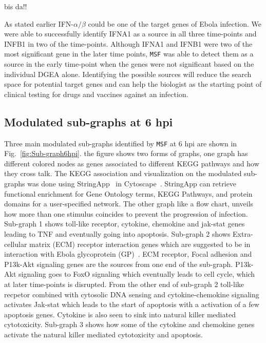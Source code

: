 \documentclass[10pt,a4paper,twocolumn]{article}
\newcommand{\TODO}[1]{\begingroup\color{red}#1\endgroup}
\begin{document}
\TODO{bis da!!}

As stated earlier IFN-$\alpha / \beta$ could be one of the target
genes of Ebola infection. We were able to successfully identify IFNA1
as a source in all three time-points and INFB1 in two of the
time-points. Although IFNA1 and IFNB1 were two of the most significant
gene in the later time points, \texttt{MSF} was able to detect them as
a source in the early time-point when the genes were not significant
based on the individual DGEA alone. Identifying the possible sources will
reduce the search space for potential target genes and can help the
biologist as the starting point of clinical testing for drugs and
vaccines against an infection.



\subsection*{Modulated sub-graphs at 6 hpi}

 Three main modulated sub-graphs identified by \texttt{MSF} at 6 hpi
 are shown in Fig.~\ref{fig:Sub-graph6hpi}. the figure shows two forms of graphs, one graph has different colored nodes as
 genes associated to different KEGG pathways and how they cross talk. The KEGG
 association and visualization on the modulated sub-graphs was done
 using StringApp~\cite{StringApp} in Cytoscape~\cite{Cyto}. StringApp can retrieve functional enrichment for Gene Ontology terms, KEGG Pathways, and protein domains for a user-specified network. The other graph like a flow chart,
 unveils how more than one stimulus coincides to prevent the
 progression of infection. Sub-graph 1 shows toll-like receptor,
 cytokine, chemokine and jak-stat genes leading to TNF and eventually
 going into apoptosis. Sub-graph 2 shows Extra-cellular matrix (ECM)
 receptor interaction genes which are suggested to be in interaction
 with Ebola glycoprotein (GP)~\cite{Veljkovic}. ECM receptor, Focal
 adhesion and P13k-Akt signaling genes are the sources from one end of
 the sub-graph. P13k-Akt signaling goes to FoxO signaling which
 eventually leads to cell cycle, which at later time-points is
 disrupted. From the other end of sub-graph 2 toll-like recpetor
 combined with cytosolic DNA sensing and cytokine-chemokine signaling
 activates Jak-stat which leads to the start of apoptosis with a
 activation of a few apoptosis genes. Cytokine is also seen to sink
 into natural killer mediated cytotoxicity. Sub-graph 3 shows how some
 of the cytokine and chemokine genes activate the natural killer
 mediated cytotoxicity and apoptosis.
 
\end{document}
